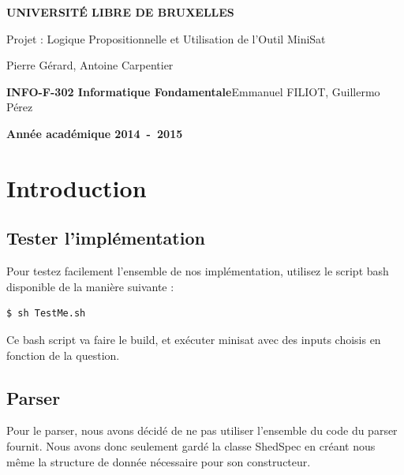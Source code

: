 \documentclass[a4paper,11pt]{article}
\begin{document}
\begin{titlepage}
\begin{center}
\textbf{\textsc{UNIVERSIT\'E LIBRE DE BRUXELLES}}\\
\vfill{}\vfill{}
\begin{center}{\Huge Projet : Logique Propositionnelle et Utilisation de l’Outil MiniSat}\end{center}{\Huge \par}
\begin{center}{\large Pierre Gérard, Antoine Carpentier}\end{center}{\Huge \par}
\vfill{}\vfill{} \vfill{}
\begin{flushleft}{\large \textbf{INFO-F-302 Informatique Fondamentale}}\hfill{Emmanuel FILIOT, Guillermo Pérez}\end{flushleft}{\large\par}
\vfill{}\vfill{}\enlargethispage{3cm}
\textbf{Année académique 2014~-~2015}
\end{center}
\end{titlepage}



\tableofcontents

\pagebreak

\section{Introduction}

\subsection{Tester l'implémentation}
Pour testez facilement l'ensemble de nos implémentation, utilisez le script bash disponible de la manière suivante :
\begin{lstlisting}
$ sh TestMe.sh	
\end{lstlisting}
Ce bash script va faire le build, et exécuter minisat avec des inputs choisis en fonction de la question.

\subsection{Parser}
Pour le parser, nous avons décidé de ne pas utiliser l'ensemble du code du parser fournit. Nous avons donc seulement gardé la classe ShedSpec en créant nous même la structure de donnée nécessaire pour son constructeur.
\end{document}
